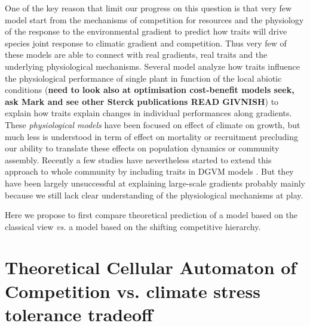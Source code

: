 \documentclass[a4paper,11pt]{article}
\begin{document}
One of the key reason that limit our progress on this question is that very few model start from the mechanisms of competition for resources and the physiology of the response to the environmental gradient to predict how traits will drive species joint response to climatic gradient and competition. Thus very few of these models are able to connect with real gradients,
real traits and the underlying physiological mechanisms. Several model
analyze how traits influence the physiological performance of single
plant in function of the local abiotic conditions \citep{Sterck-2011}
(\textbf{need to look also at optimisation cost-benefit models seek, ask Mark
and see other Sterck publications READ GIVNISH}) to explain how traits explain changes in individual performances along gradients. These \textit{physiological models} have been focused on effect of climate on growth, but much less is understood in term of effect on mortality or recruitment precluding our ability to translate these effects on population dynamics or community assembly. Recently a few studies have nevertheless started to extend this approach to whole community by including traits in DGVM models \citep[see][]{Sakschewski-2015,Scheiter-2013}. But they have been largely unsuccessful at explaining large-scale gradients probably mainly because we still lack clear understanding of the physiological mechanisms at play.

Here we propose to first compare theoretical prediction of a model based on the classical view \textit{vs.} a model based on the shifting competitive hierarchy.


\clearpage

\section{Theoretical Cellular Automaton of Competition vs. climate stress tolerance tradeoff}
\end{document}
